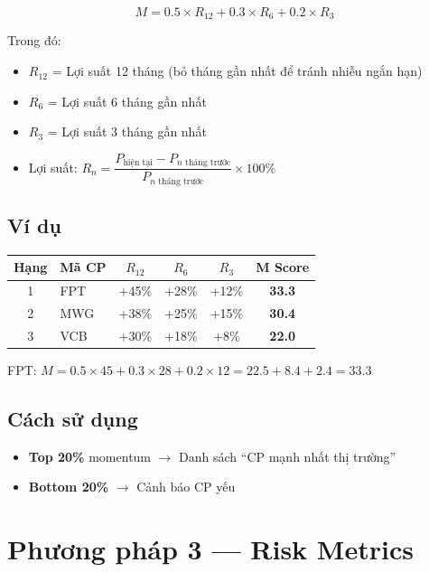 \documentclass[12pt,a4paper]{article}
\begin{document}
\begin{equation}
\boxed{
  M = 0.5 \times R_{12} + 0.3 \times R_6 + 0.2 \times R_3
}
\end{equation}

Trong đó:
\begin{itemize}[nosep]
  \item $R_{12}$ = Lợi suất 12 tháng (bỏ tháng gần nhất để tránh nhiễu ngắn hạn)
  \item $R_6$ = Lợi suất 6 tháng gần nhất
  \item $R_3$ = Lợi suất 3 tháng gần nhất
  \item Lợi suất: $R_n = \dfrac{P_{\text{hiện tại}} - P_{n\text{ tháng trước}}}{P_{n\text{ tháng trước}}} \times 100\%$
\end{itemize}

\subsection{Ví dụ}

\begin{tabularx}{\textwidth}{c l c c c c}
\toprule
\textbf{Hạng} & \textbf{Mã CP} & $R_{12}$ & $R_6$ & $R_3$ & \textbf{M Score} \\
\midrule
1 & FPT & +45\% & +28\% & +12\% & \textbf{33.3} \\
2 & MWG & +38\% & +25\% & +15\% & \textbf{30.4} \\
3 & VCB & +30\% & +18\% & +8\% & \textbf{22.0} \\
\bottomrule
\end{tabularx}

FPT: $M = 0.5 \times 45 + 0.3 \times 28 + 0.2 \times 12 = 22.5 + 8.4 + 2.4 = \mathbf{33.3}$

\subsection{Cách sử dụng}
\begin{itemize}
  \item \textbf{Top 20\%} momentum $\rightarrow$ Danh sách ``CP mạnh nhất thị trường''
  \item \textbf{Bottom 20\%} $\rightarrow$ Cảnh báo CP yếu
\end{itemize}

\newpage
\section{Phương pháp 3 — Risk Metrics}
\end{document}
